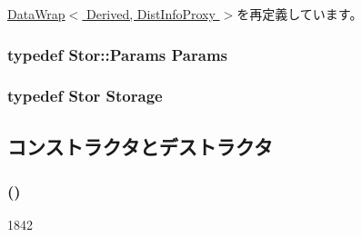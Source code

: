 \hyperlink{classStats_1_1DataWrap_a76d2c248839f34168d2a3760bc1fbdb9}{DataWrap$<$ Derived, DistInfoProxy $>$}を再定義しています。\hypertarget{classStats_1_1DistBase_a24c5f88dc162c95e0b32ade67a7ea674}{
\subsubsection[{Params}]{\setlength{\rightskip}{0pt plus 5cm}typedef Stor::Params {\bf Params}}}
\label{classStats_1_1DistBase_a24c5f88dc162c95e0b32ade67a7ea674}
\hypertarget{classStats_1_1DistBase_a5d4a6db0e7c32292f54a08d05c671bd1}{
\subsubsection[{Storage}]{\setlength{\rightskip}{0pt plus 5cm}typedef Stor {\bf Storage}}}
\label{classStats_1_1DistBase_a5d4a6db0e7c32292f54a08d05c671bd1}


\subsection{コンストラクタとデストラクタ}
\hypertarget{classStats_1_1DistBase_adb664a2a3175d8daac67eb46c27d8528}{
\subsubsection[{DistBase}]{ ()}}
\label{classStats_1_1DistBase_adb664a2a3175d8daac67eb46c27d8528}



\begin{DoxyCode}
1842 { }
\end{DoxyCode}


